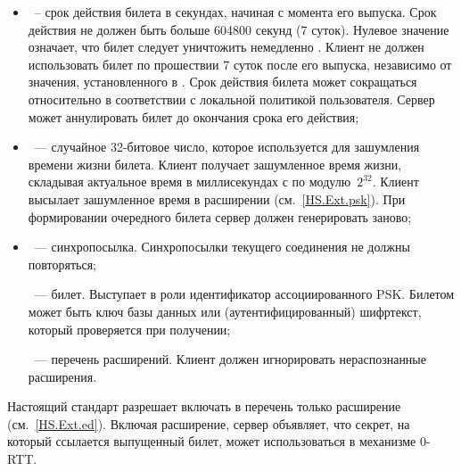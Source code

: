 \begin{itemize}
\item
{}~-- срок действия билета в секундах, начиная с момента 
его выпуска.
%
%
Срок действия не должен быть больше 604800 секунд (7 суток). Нулевое значение
 означает, что билет следует уничтожить немедленно 
.
% 
Клиент не должен использовать билет по прошествии 7 суток после его выпуска,
независимо от значения, установленного в .
%
Срок действия билета может сокращаться относительно 
в соответствии с локальной политикой пользователя.
%
Сервер может аннулировать билет до окончания срока его действия; 


\item
{}~--- случайное 32-битовое число, которое используется для 
зашумления времени жизни билета. Клиент получает зашумленное время жизни, 
складывая актуальное время в миллисекундах с  по 
модулю~$2^{32}$. Клиент высылает зашумленное время в расширении 
 (см.~\ref{HS.Ext.psk}). При формировании  
очередного билета сервер должен генерировать  заново;

\item
{}~--- синхропосылка. Синхропосылки текущего соединения не 
должны повторяться;

~--- билет. Выступает в роли идентификатор ассоциированного PSK. 
Билетом может быть ключ базы данных или (аутентифицированный) шифртекст, 
который проверяется при получении;


~--- перечень расширений. Клиент должен игнорировать 
нераспознанные расширения.
\end{itemize}

Настоящий стандарт разрешает включать в перечень
 только расширение 
 (см.~\ref{HS.Ext.ed}). Включая расширение, сервер 
объявляет, что секрет, на который ссылается выпущенный билет, может 
использоваться в механизме \mbox{0-RTT}.

